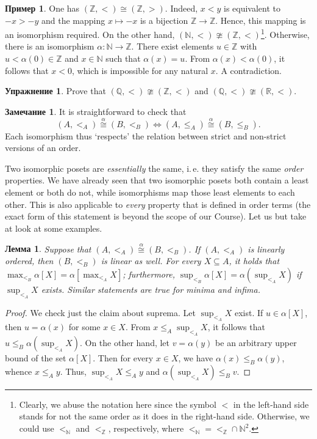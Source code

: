 \documentclass[12pt,notitlepage]{article}
\theoremstyle{plain}
\newtheorem{lemma}[thm]{Лемма}
\theoremstyle{definition}
\newtheorem{exc}[thm]{Упражнение}
\newtheorem{exm}[thm]{Пример}
\newtheorem{rem}[thm]{Замечание}
\theoremstyle{plain}
\newcommand{\N}{\mathbb{N}}
\newcommand{\Z}{\mathbb{Z}}
\newcommand{\Q}{\mathbb{Q}}
\newcommand{\R}{\mathbb{R}}
\newcommand{\sbs}{\subseteq}
\newcommand{\1}{\mathbf{1}}
\newcommand{\0}{\mathbf{0}}
\begin{document}
\begin{exm}
	One has $(\Z, <) \cong (\Z, >)$. Indeed, $x < y$ is equivalent to $-x > -y$ and the mapping $x \mapsto -x$ is a bijection $\Z \to \Z$. Hence, this mapping is an isomorphism required. On the other hand, $(\N, <) \ncong (\Z, <)$\;\footnote{Clearly, we abuse the notation here since the symbol ${<}$ in the left-hand side stands for not the same order as it does in the right-hand side. Otherwise, we could use $<_{\N}$ and $<_{\Z}$, respectively, where ${<_{\N}} = {<_{\Z}} \cap \N^2$.}. Otherwise, there is an isomorphism $\alpha\colon \N \to \Z$. There exist elements $u \in \Z$ with $u < \alpha(0) \in \Z$ and $x \in \N$ such that $\alpha(x) = u$. From $\alpha(x) < \alpha(0)$, it follows that $x < 0$, which is impossible for any natural $x$. A contradiction.
\end{exm}
\begin{exc}
	Prove that $(\Q, <) \ncong (\Z, <)$ and $(\Q, <) \ncong (\R, <)$.
\end{exc}

\begin{rem}
	It is straightforward to check that
	$$(A, <_A) \stackrel{\alpha}{\cong} (B, <_B) \iff (A, \leq_A) \stackrel{\alpha}{\cong} (B, \leq_B).$$
	Each isomorphism thus `respects' the relation between strict and non-strict versions of an order.
\end{rem}

Two isomorphic posets are \emph{essentially} the same, i.\,e. they satisfy the same \emph{order} properties. We have already seen that two isomorphic posets both contain a least element or both do not, while isomorphisms map those least elements to each other. This is also applicable to \emph{every} property that is defined in order terms (the exact form of this statement is beyond the scope of our Course). Let us but take at look at some examples.
\begin{lemma}
	Suppose that $(A, <_A) \stackrel{\alpha}{\cong} (B, <_B)$. If $(A, <_A)$ is linearly ordered, then $(B, <_B)$ is linear as well. For every $X \sbs A$, it holds that $\max_{<_B} \alpha[X] = \alpha[ \max_{<_A} X ]$; furthermore, $\sup_{<_B} \alpha[X] = \alpha(\sup_{<_A} X)$ if $\sup_{<_A} X$ exists. Similar statements are true for minima and infima.
\end{lemma}
\begin{proof}
	We check just the claim about suprema. Let $\sup_{<_A} X$ exist. If $u \in \alpha[X]$, then $u = \alpha(x)$ for some $x \in X$. From $x \leq_A \sup_{<_A} X$, it follows that $u \leq_B \alpha(\sup_{<_A} X)$. On the other hand, let $v = \alpha(y)$ be an arbitrary upper bound of the set $\alpha[X]$. Then for every $x \in X$, we have $\alpha(x) \leq_B \alpha(y)$, whence $x \leq_A y$. Thus, $\sup_{<_A} X \leq_A y$ and $\alpha(\sup_{<_A} X) \leq_B v$.
\end{proof}
\end{document}

